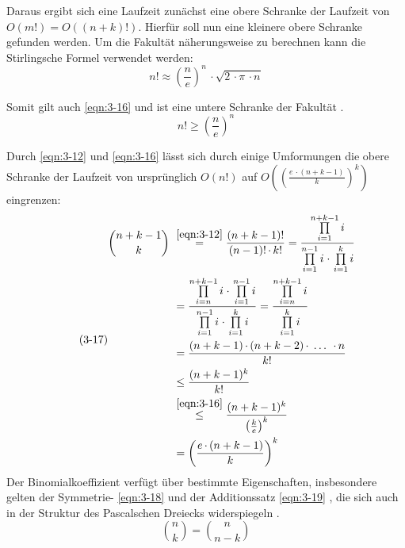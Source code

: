 Daraus ergibt sich eine Laufzeit zunächst eine obere Schranke der Laufzeit von $ O(m!) = O((n + k)!) $. Hierfür soll nun eine kleinere obere Schranke gefunden werden. Um die Fakultät näherungsweise zu berechnen kann die Stirlingsche Formel \cite{bronst} verwendet werden:
\begin{equation} \label{eqn:3-15}
\tag{3-15}
n! \approx \left( \frac{n}{e} \right) ^n \, \cdotp \sqrt{2 \, \cdotp \pi \, \cdotp n}
\end{equation} 

Somit gilt auch \eqref{eqn:3-16} und ist eine untere Schranke der Fakultät \cite{script_binom}.
\begin{equation} \label{eqn:3-16}
\tag{3-16}
n! \geq \left( \frac{n}{e} \right) ^n 
\end{equation} 

Durch \eqref{eqn:3-12} und \eqref{eqn:3-16} lässt sich durch einige Umformungen die obere Schranke der Laufzeit von ursprünglich $ O(n!) $  auf $ O\left( \left( \frac{e \, \cdotp (n + k - 1)}{k}\right)^k\right) $ eingrenzen:
\begin{equation} \label{eqn:3-17}
\tag{3-17}
\begin{aligned}
\binom{n + k - 1}{k} &\ {} \overset{\eqref{eqn:3-12}}{=}  \frac{(n+k-1)!}{(n-1)!\, \cdotp k!} = \frac{\prod\limits_{i=1}^{n+k-1}i}{\prod\limits_{i=1}^{n-1}i \; \cdotp \, \prod\limits_{i=1}^{k}i}  \\
&\ = \frac{\prod\limits_{i=n}^{n+k-1}i \; \cdotp \, \prod\limits_{i=1}^{n-1}i}{\prod\limits_{i=1}^{n-1}i \; \cdotp \, \prod\limits_{i=1}^{k}i} = \frac{\prod\limits_{i=n}^{n+k-1}i}{\prod\limits_{i=1}^{k}i}\\
&\ = \frac{(n + k - 1) \, \cdotp (n + k - 2)\, \cdotp \; \dots \; \, \cdotp n}{k!} \\
&\ \leq \frac{(n + k - 1)^k}{k!} \\
&\ \overset{\eqref{eqn:3-16}}{\leq} \frac{(n + k - 1)^k}{\left( \frac{k}{e} \right) ^k} \\
&\ = \left( \frac{e \, \cdotp (n + k - 1)}{k}\right)^k  \\
\end{aligned}
\end{equation} 
Der Binomialkoeffizient verfügt über bestimmte Eigenschaften, insbesondere gelten der Symmetrie- \eqref{eqn:3-18} und der Additionssatz \eqref{eqn:3-19} , die sich auch in der Struktur des Pascalschen Dreiecks widerspiegeln \cite{bronst}. 
\begin{equation} \label{eqn:3-18}
\tag{3-18}
\binom{n}{k} = \binom{n}{n - k}
\end{equation} 
